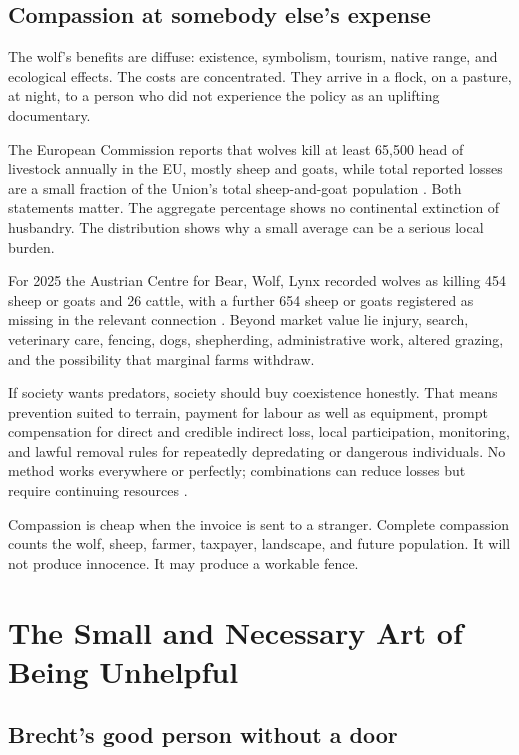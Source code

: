 \documentclass[12pt,a4paper]{book}
\begin{document}
\section{Compassion at somebody else's expense}

The wolf's benefits are diffuse: existence, symbolism, tourism, native range,
and ecological effects.  The costs are concentrated.  They arrive in a flock,
on a pasture, at night, to a person who did not experience the policy as an
uplifting documentary.

The European Commission reports that wolves kill at least 65,500 head of
livestock annually in the EU, mostly sheep and goats, while total reported
losses are a small fraction of the Union's total sheep-and-goat population
\cite{ECLargeCarnivoreFacts2026}.  Both statements matter.  The aggregate
percentage shows no continental extinction of husbandry.  The distribution
shows why a small average can be a serious local burden.

For 2025 the Austrian Centre for Bear, Wolf, Lynx recorded wolves as killing
454 sheep or goats and 26 cattle, with a further 654 sheep or goats registered
as missing in the relevant connection \cite{AustrianCarnivoreLosses2025}.
Beyond market value lie injury, search, veterinary care, fencing, dogs,
shepherding, administrative work, altered grazing, and the possibility that
marginal farms withdraw.

If society wants predators, society should buy coexistence honestly.  That
means prevention suited to terrain, payment for labour as well as equipment,
prompt compensation for direct and credible indirect loss, local participation,
monitoring, and lawful removal rules for repeatedly depredating or dangerous
individuals.  No method works everywhere or perfectly; combinations can reduce
losses but require continuing resources
\cite{AlpineConventionCarnivorePrevention2024}.

Compassion is cheap when the invoice is sent to a stranger.  Complete
compassion counts the wolf, sheep, farmer, taxpayer, landscape, and future
population.  It will not produce innocence.  It may produce a workable fence.

\chapter{The Small and Necessary Art of Being Unhelpful}
\label{chap:art-unhelpful}

\section{Brecht's good person without a door}
\end{document}
